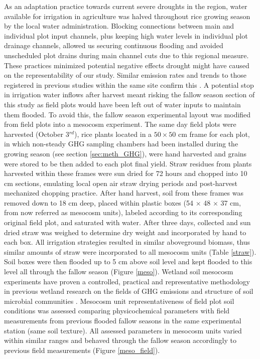 As an adaptation practice towards current severe droughts in the region, water available for irrigation in agriculture was halved throughout rice growing season by the local water administration. Blocking connections between main and individual plot input channels, plus keeping high water levels in individual plot drainage channels, allowed us securing continuous flooding and avoided unscheduled plot drains during main channel cuts due to this regional measure. These practices minimized potential negative effects drought might have caused on the representability of our study. Similar emission rates and trends to those registered in previous studies within the same site confirm this \citep{martinez-eixarch2021a}. A potential stop in irrigation water inflows after harvest meant risking the fallow season section of this study as field plots would have been left out of water inputs to maintain them flooded. To avoid this, the fallow season experimental layout was modified from field plots into a mesocosm experiment. The same day field plots were harvested (October 3$^{rd}$), rice plants located in a $50 \times 50$ cm frame for each plot, in which non-steady GHG sampling chambers had been installed during the growing season (see section \ref{sec:meth_GHG}), were hand harvested and grains were stored to be then added to each plot final yield. Straw residues from plants harvested within these frames were sun dried for 72 hours and chopped into 10 cm sections, emulating local open air straw drying periods and post-harvest mechanized chopping practice. After hand harvest, soil from these frames was removed down to 18 cm deep, placed within plastic boxes (54 $\times$ 48 $\times$ 37 cm, from now referred as mesocosm units), labeled according to its corresponding original field plot, and saturated with water. After three days, collected and sun dried straw was weighed to determine dry weight and incorporated by hand to each box. All irrigation strategies resulted in similar aboveground biomass, thus similar amounts of straw were incorporated to all mesocosm units (Table \ref{straw}). Soil boxes were then flooded up to 5 cm above soil level and kept flooded to this level all through the fallow season (Figure \ref{meso}). Wetland soil mesocosm experiments have proven a controlled, practical and representative methodology in previous wetland research on the fields of GHG emissions \citep{capooci2019experimental} and structure of soil microbial communities \citep{donato2020nitrogen}. Mesocosm unit representativeness of field plot soil conditions was assessed comparing physicochemical parameters with field measurements from previous flooded fallow seasons in the same experimental station (same soil texture). All assessed parameters in mesocosm units varied within similar ranges and behaved through the fallow season accordingly to previous field measurements (Figure \ref{meso_field}). \\

